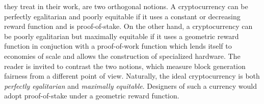 they treat in their work, are two orthogonal notions. A
cryptocurrency can be perfectly egalitarian and poorly equitable if it uses a
constant or decreasing reward function and is proof-of-stake. On the other hand,
a cryptocurrency can be poorly egalitarian but maximally equitable if it uses a
geometric reward function in conjuction with a proof-of-work function which
lends itself to economies of scale and allows the construction of specialized
hardware. The reader is invited to contrast the two notions, which measure
block generation fairness from a different point of view. Naturally, the ideal cryptocurrency is both \emph{perfectly egalitarian}
and \emph{maximally equitable}. Designers of such a currency would adopt
proof-of-stake under a geometric reward function.

